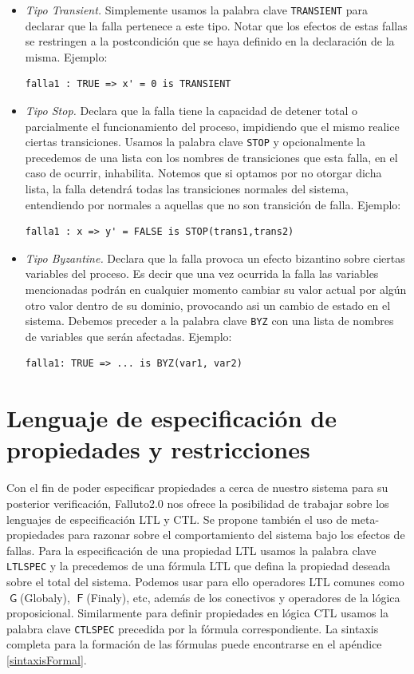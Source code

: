 \documentclass[titlepage, 12pt]{book}
\newcommand{\G}{\mathop{\mathsf{G}}}
\newcommand{\F}{\mathop{\mathsf{F}}}
\begin{document}
\begin{itemize}
\item \textit{Tipo Transient.} Simplemente usamos la palabra clave \texttt{TRANSIENT} para declarar que la falla pertenece a este tipo. Notar que los efectos de estas fallas se restringen a la postcondici\'on que se haya definido en la declaraci\'on de la misma. Ejemplo: \begin{verbatim}falla1 : TRUE => x' = 0 is TRANSIENT\end{verbatim}
\item \textit{Tipo Stop.} Declara que la falla tiene la capacidad de detener total o parcialmente el funcionamiento del proceso, impidiendo que el mismo realice ciertas transiciones. Usamos la palabra clave \texttt{STOP} y opcionalmente la precedemos de una lista con los nombres de transiciones que esta falla, en el caso de ocurrir, inhabilita. Notemos que si optamos por no otorgar dicha lista, la falla detendr\'a todas las transiciones normales del sistema, entendiendo por normales a aquellas que no son transici\'on de falla. Ejemplo: \begin{verbatim}falla1 : x => y' = FALSE is STOP(trans1,trans2) \end{verbatim}
\item \textit{Tipo Byzantine.} Declara que la falla provoca un efecto bizantino sobre ciertas variables del proceso. Es decir que una vez ocurrida la falla las variables mencionadas podr\'an en cualquier momento cambiar su valor actual por alg\'un otro valor dentro de su dominio, provocando asi un cambio de estado en el sistema. Debemos preceder a la palabra clave \texttt{BYZ} con una lista de nombres de variables que ser\'an afectadas. Ejemplo: \begin{verbatim}falla1: TRUE => ... is BYZ(var1, var2) \end{verbatim}
\end{itemize}

\section{Lenguaje de especificaci\'on de propiedades y restricciones}

Con el fin de poder especificar propiedades a cerca de nuestro sistema para su posterior verificaci\'on, Falluto2.0 nos ofrece la posibilidad de trabajar sobre los lenguajes de especificaci\'on LTL y CTL. Se propone tambi\'en el uso de meta-propiedades para razonar sobre el comportamiento del sistema bajo los efectos de fallas.
Para la especificaci\'on de una propiedad LTL usamos la palabra clave \texttt{LTLSPEC} y la precedemos de una f\'ormula LTL que defina la propiedad deseada sobre el total del sistema. Podemos usar para ello operadores LTL comunes como $\G$(Globaly), $\F$(Finaly), etc, adem\'as de los conectivos y operadores de la l\'ogica proposicional. Similarmente para definir propiedades en l\'ogica CTL usamos la palabra clave \texttt{CTLSPEC} precedida por la f\'ormula correspondiente. La sintaxis completa para la formaci\'on de las f\'ormulas puede encontrarse en el ap\'endice \ref{sintaxisFormal}.
\end{document}
